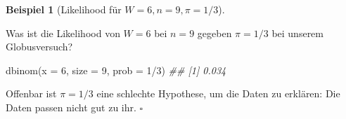 \documentclass[
  ngerman,
  letterpaper,
  twoside,
  open=any]{scrbook}
\newenvironment{Shaded}{\begin{snugshade}}{\end{snugshade}}
\newcommand{\AttributeTok}[1]{\textcolor[rgb]{0.40,0.45,0.13}{#1}}
\newcommand{\DecValTok}[1]{\textcolor[rgb]{0.68,0.00,0.00}{#1}}
\newcommand{\DocumentationTok}[1]{\textcolor[rgb]{0.37,0.37,0.37}{\textit{#1}}}
\newcommand{\FunctionTok}[1]{\textcolor[rgb]{0.28,0.35,0.67}{#1}}
\newcommand{\NormalTok}[1]{\textcolor[rgb]{0.00,0.23,0.31}{#1}}
\newcommand{\SpecialCharTok}[1]{\textcolor[rgb]{0.37,0.37,0.37}{#1}}
\theoremstyle{definition}
\newtheorem{example}{Beispiel}[chapter]
\theoremstyle{plain}
\theoremstyle{definition}
\theoremstyle{definition}
\theoremstyle{definition}
\newtheorem{example}{Beispiel}[chapter]
\theoremstyle{definition}
\theoremstyle{remark}
\begin{document}
\begin{example}[Likelihood für
\(W = 6, n = 9, \pi=1/3\)]\protect\hypertarget{exm-globus2}{}\label{exm-globus2}

Was ist die Likelihood von \(W=6\) bei \(n=9\) gegeben \(\pi=1/3\) bei
unserem Globusversuch?

\begin{Shaded}
\begin{Highlighting}[]
\FunctionTok{dbinom}\NormalTok{(}\AttributeTok{x =} \DecValTok{6}\NormalTok{, }\AttributeTok{size =} \DecValTok{9}\NormalTok{, }\AttributeTok{prob =} \DecValTok{1}\SpecialCharTok{/}\DecValTok{3}\NormalTok{)}
\DocumentationTok{\#\# [1] 0.034}
\end{Highlighting}
\end{Shaded}

Offenbar ist \(\pi=1/3\) eine schlechte Hypothese, um die Daten zu
erklären: Die Daten passen nicht gut zu ihr. \(\square\)

\end{example}
\end{document}
